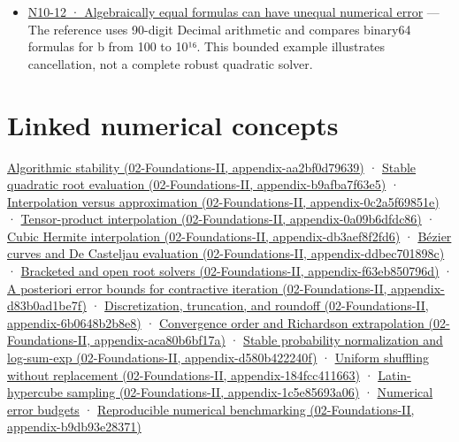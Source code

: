 \begin{itemize}
\item
  \href{Continuous\%20Notes/Computing\%20Foundations\%20-\%20From\%20Bits\%20to\%20C++\%20and\%20Systems\%20APIs\#Figure\%20N10-12\%20—\%20Algebraically\%20equal\%20formulas\%20can\%20have\%20unequal\%20numerical\%20error}{N10-12 · Algebraically equal formulas can have unequal numerical error} --- The reference uses 90-digit Decimal arithmetic and compares binary64 formulas for b from 100 to 10¹⁶. This bounded example illustrates cancellation, not a complete robust quadratic solver.
\end{itemize}

\section{Linked numerical concepts}\label{appendix-cb5af353ef77-linked-numerical-concepts}

\href{../02-Foundations-II/main.pdf\#nameddest=appendix-aa2bf0d79639}{Algorithmic stability (02-Foundations-II, appendix-aa2bf0d79639)} · \href{../02-Foundations-II/main.pdf\#nameddest=appendix-b9afba7f63e5}{Stable quadratic root evaluation (02-Foundations-II, appendix-b9afba7f63e5)} · \href{../02-Foundations-II/main.pdf\#nameddest=appendix-0c2a5f69851e}{Interpolation versus approximation (02-Foundations-II, appendix-0c2a5f69851e)} · \href{../02-Foundations-II/main.pdf\#nameddest=appendix-0a09b6dfdc86}{Tensor-product interpolation (02-Foundations-II, appendix-0a09b6dfdc86)} · \href{../02-Foundations-II/main.pdf\#nameddest=appendix-db3aef8f2fd6}{Cubic Hermite interpolation (02-Foundations-II, appendix-db3aef8f2fd6)} · \href{../02-Foundations-II/main.pdf\#nameddest=appendix-ddbec701898c}{Bézier curves and De Casteljau evaluation (02-Foundations-II, appendix-ddbec701898c)} · \href{../02-Foundations-II/main.pdf\#nameddest=appendix-f63eb850796d}{Bracketed and open root solvers (02-Foundations-II, appendix-f63eb850796d)} · \href{../02-Foundations-II/main.pdf\#nameddest=appendix-d83b0ad1be7f}{A posteriori error bounds for contractive iteration (02-Foundations-II, appendix-d83b0ad1be7f)} · \href{../02-Foundations-II/main.pdf\#nameddest=appendix-6b0648b2b8e8}{Discretization, truncation, and roundoff (02-Foundations-II, appendix-6b0648b2b8e8)} · \href{../02-Foundations-II/main.pdf\#nameddest=appendix-aca80b6bf17a}{Convergence order and Richardson extrapolation (02-Foundations-II, appendix-aca80b6bf17a)} · \href{../02-Foundations-II/main.pdf\#nameddest=appendix-d580b422240f}{Stable probability normalization and log-sum-exp (02-Foundations-II, appendix-d580b422240f)} · \href{../02-Foundations-II/main.pdf\#nameddest=appendix-184fcc411663}{Uniform shuffling without replacement (02-Foundations-II, appendix-184fcc411663)} · \href{../02-Foundations-II/main.pdf\#nameddest=appendix-1c5e85693a06}{Latin-hypercube sampling (02-Foundations-II, appendix-1c5e85693a06)} · \hyperref[appendix-31b8c295e05f]{Numerical error budgets} · \href{../02-Foundations-II/main.pdf\#nameddest=appendix-b9db93e28371}{Reproducible numerical benchmarking (02-Foundations-II, appendix-b9db93e28371)}

